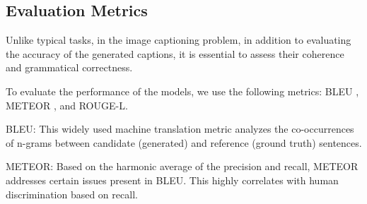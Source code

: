 \documentclass[conference]{IEEEtran}
\begin{document}
\begin{table}[h]
\centering
\caption{Performance of three models comparison in terms of BLEU-n (n = 1,2,3,4), METEOR, ROUGE-L, and CIDEr on the Flickr30k dataset. Bold numbers represent the best result for each metric.}
\label{tab:metric-compare-1}
\end{table}


\subsection{Evaluation Metrics}
Unlike typical tasks, in the image captioning problem, in addition to evaluating the accuracy of the generated captions, it is essential to assess their coherence and grammatical correctness.


To evaluate the performance of the models, we use the following metrics: BLEU \cite{papineni2002bleu}, METEOR \cite{banerjee2005meteor}, and ROUGE-L.


BLEU: This widely used machine translation metric analyzes the co-occurrences of n-grams between candidate (generated) and reference (ground truth) sentences.


METEOR: Based on the harmonic average of the precision and recall, METEOR addresses certain issues present in BLEU. This highly correlates with human discrimination based on recall.
\end{document}
